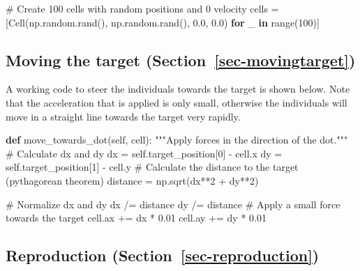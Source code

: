 \documentclass[
  letterpaper,
  DIV=11,
  numbers=noendperiod]{scrreprt}
\newenvironment{Shaded}{\begin{snugshade}}{\end{snugshade}}
\newcommand{\BuiltInTok}[1]{\textcolor[rgb]{0.00,0.23,0.31}{#1}}
\newcommand{\CommentTok}[1]{\textcolor[rgb]{0.37,0.37,0.37}{#1}}
\newcommand{\ControlFlowTok}[1]{\textcolor[rgb]{0.00,0.23,0.31}{\textbf{#1}}}
\newcommand{\DecValTok}[1]{\textcolor[rgb]{0.68,0.00,0.00}{#1}}
\newcommand{\FloatTok}[1]{\textcolor[rgb]{0.68,0.00,0.00}{#1}}
\newcommand{\KeywordTok}[1]{\textcolor[rgb]{0.00,0.23,0.31}{\textbf{#1}}}
\newcommand{\NormalTok}[1]{\textcolor[rgb]{0.00,0.23,0.31}{#1}}
\newcommand{\OperatorTok}[1]{\textcolor[rgb]{0.37,0.37,0.37}{#1}}
\newcommand{\VariableTok}[1]{\textcolor[rgb]{0.07,0.07,0.07}{#1}}
\theoremstyle{definition}
\theoremstyle{remark}
\begin{document}
\begin{enumerate}
\begin{Shaded}
\begin{Highlighting}[]
\CommentTok{\# Create 100 cells with random positions and 0 velocity}
\NormalTok{cells }\OperatorTok{=}\NormalTok{ [Cell(np.random.rand(), np.random.rand(), }\FloatTok{0.0}\NormalTok{, }\FloatTok{0.0}\NormalTok{) }\ControlFlowTok{for}\NormalTok{ \_ }\KeywordTok{in} \BuiltInTok{range}\NormalTok{(}\DecValTok{100}\NormalTok{)]}
\end{Highlighting}
\end{Shaded}
\end{enumerate}

\subsection{\texorpdfstring{Moving the target
(Section~\ref{sec-movingtarget})}{Moving the target (Section~)}}\label{moving-the-target-sec-movingtarget}

A working code to steer the individuals towards the target is shown
below. Note that the acceleration that is applied is only small,
otherwise the individuals will move in a straight line towards the
target very rapidly.

\begin{Shaded}
\begin{Highlighting}[]
\KeywordTok{def}\NormalTok{ move\_towards\_dot(}\VariableTok{self}\NormalTok{, cell):}
   \CommentTok{"""Apply forces in the direction of the dot."""}
   \CommentTok{\# Calculate dx and dy}
\NormalTok{   dx }\OperatorTok{=} \VariableTok{self}\NormalTok{.target\_position[}\DecValTok{0}\NormalTok{] }\OperatorTok{{-}}\NormalTok{ cell.x}
\NormalTok{   dy }\OperatorTok{=} \VariableTok{self}\NormalTok{.target\_position[}\DecValTok{1}\NormalTok{] }\OperatorTok{{-}}\NormalTok{ cell.y}
   \CommentTok{\# Calculate the distance to the target (pythagorean theorem)}
\NormalTok{   distance }\OperatorTok{=}\NormalTok{ np.sqrt(dx}\OperatorTok{**}\DecValTok{2} \OperatorTok{+}\NormalTok{ dy}\OperatorTok{**}\DecValTok{2}\NormalTok{)}
   
   \CommentTok{\# Normalize dx and dy }
\NormalTok{   dx }\OperatorTok{/=}\NormalTok{ distance}
\NormalTok{   dy }\OperatorTok{/=}\NormalTok{ distance}
   \CommentTok{\# Apply a small force towards the target}
\NormalTok{   cell.ax }\OperatorTok{+=}\NormalTok{ dx }\OperatorTok{*} \FloatTok{0.01}
\NormalTok{   cell.ay }\OperatorTok{+=}\NormalTok{ dy }\OperatorTok{*} \FloatTok{0.01}
\end{Highlighting}
\end{Shaded}

\subsection{\texorpdfstring{Reproduction
(Section~\ref{sec-reproduction})}{Reproduction (Section~)}}\label{reproduction-sec-reproduction}
\end{document}
